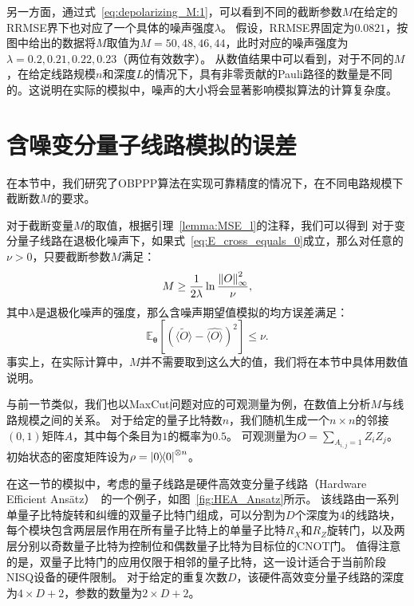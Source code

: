 另一方面，通过式~\eqref{eq:depolarizing_M:1}，可以看到不同的截断参数$M$在给定的RRMSE界下也对应了一个具体的噪声强度$\lambda$。
假设，RRMSE界固定为$0.0821$，按图中给出的数据将$M$取值为$M=50,48,46,44$，此时对应的噪声强度为$\lambda=0.2,0.21,0.22,0.23$（两位有效数字）。
从数值结果中可以看到，对于不同的$M$，在给定线路规模$n$和深度$L$的情况下，具有非零贡献的Pauli路径的数量是不同的。这说明在实际的模拟中，噪声的大小将会显著影响模拟算法的计算复杂度。


\section{含噪变分量子线路模拟的误差}

在本节中，我们研究了OBPPP算法在实现可靠精度的情况下，在不同电路规模下截断数$M$的要求。

对于截断变量$M$的取值，根据引理~\ref{lemma:MSE_l}的注释，我们可以得到
对于变分量子线路在退极化噪声下，如果式~\eqref{eq:E_cross_equals_0}成立，那么对任意的$\nu > 0$，只要截断参数$M$满足：
\begin{equation}\label{eq:depolarizing_M}
    M\geq\frac{1}{2\lambda}\ln{\frac{\norm{O}_\infty^2}{\nu}},
\end{equation}
其中$\lambda$是退极化噪声的强度，那么含噪声期望值模拟的均方误差满足：
\begin{equation}
    \mathbb{E}_{\bm{\theta}}\left[\left(\widetilde{\langle O\rangle}-\widehat{\langle O\rangle}\right)^2\right]\leq\nu.
\end{equation}
事实上，在实际计算中，$M$并不需要取到这么大的值，我们将在本节中具体用数值说明。


与前一节类似，我们也以MaxCut问题对应的可观测量为例，在数值上分析$M$与线路规模之间的关系。
对于给定的量子比特数$n$，我们随机生成一个$n\times n$的邻接$(0,1)$矩阵$A$，其中每个条目为$1$的概率为$0.5$。
可观测量为$O=\sum_{A_{i,j}=1} Z_iZ_j$。
初始状态的密度矩阵设为$\rho=\ketbra{0}{0}^{\otimes n}$。

在这一节的模拟中，考虑的量子线路是硬件高效变分量子线路（Hardware Efficient Ans\"atz）~\cite{kandala2017hardwarea}的一个例子，如图~\ref{fig:HEA_Ansatz}所示。
该线路由一系列单量子比特旋转和纠缠的双量子比特门组成，可以分割为$D$个深度为$4$的线路块，每个模块包含两层层作用在所有量子比特上的单量子比特$R_X$和$R_Z$旋转门，以及两层分别以奇数量子比特为控制位和偶数量子比特为目标位的CNOT门。
值得注意的是，双量子比特门的应用仅限于相邻的量子比特，这一设计适合于当前阶段NISQ设备的硬件限制。
对于给定的重复次数$D$，该硬件高效变分量子线路的深度为$4\times D+2$，参数的数量为$2\times D+2$。



